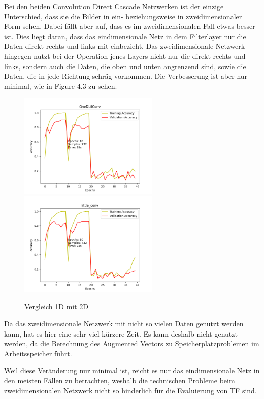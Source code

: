 Bei den beiden Convolution Direct Cascade Netzwerken ist der einzige Unterschied, dass sie die Bilder in ein- beziehungsweise in 
zweidimensionaler Form sehen. Dabei fällt aber auf, dass es im zweidimensionalen Fall etwas besser ist. 
Dies liegt daran, dass das eindimensionale Netz in dem Filterlayer nur die Daten direkt rechts und links mit einbezieht. Das 
zweidimensionale Netzwerk hingegen nutzt bei der Operation jenes Layers nicht nur die direkt rechts und links, sondern auch die Daten, 
die oben und unten angrenzend sind, sowie die Daten, die in jede Richtung schräg vorkommen. 
Die Verbesserung ist aber nur minimal, wie in Figure 4.3 zu sehen. 

\begin{figure}[htpb]
    \includegraphics[height=5cm]{../../Plots/ba_plots/dimensionality/1dim_tr.png}
    \includegraphics[height=5cm]{../../Plots/ba_plots/dimensionality/2dim_tr.png}
    \caption{\label{fig:dim} Vergleich 1D mit 2D}
\end{figure}

Da das zweidimensionale Netzwerk mit nicht so vielen Daten genutzt werden kann, hat es hier eine sehr viel kürzere Zeit. Es kann deshalb 
nicht genutzt werden, da die Berechnung des Augmented Vectors zu Speicherplatzproblemen im Arbeitsspeicher führt. 

Weil diese Veränderung nur minimal ist, reicht es nur das eindimensionale Netz in den meisten Fällen zu betrachten, weshalb die technischen 
Probleme beim zweidimensionalen Netzwerk nicht so hinderlich für die Evaluierung von TF sind. 
